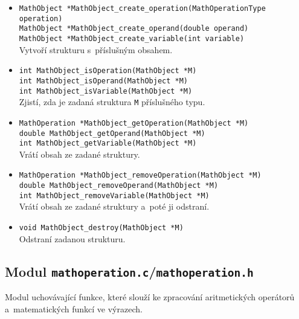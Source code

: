 \documentclass[pdftex,a4paper]{article}
\begin{document}
\begin{itemize}
\item \texttt{MathObject *MathObject\_create\_operation(MathOperationType operation)} \\ 
	  \texttt{MathObject *MathObject\_create\_operand(double operand)} \\
	  \texttt{MathObject *MathObject\_create\_variable(int variable)} \\
	  Vytvoří strukturu s~příslušným obsahem.
	  
\item \texttt{int MathObject\_isOperation(MathObject *M)} \\ 
	  \texttt{int MathObject\_isOperand(MathObject *M)} \\
	  \texttt{int MathObject\_isVariable(MathObject *M)} \\
	  Zjistí, zda je zadaná struktura \texttt{M} příslušného typu.
	  	  
\item \texttt{MathOperation *MathObject\_getOperation(MathObject *M)} \\ 
	  \texttt{double MathObject\_getOperand(MathObject *M)} \\
	  \texttt{int MathObject\_getVariable(MathObject *M)} \\
	  Vrátí obsah ze zadané struktury.
	  	  	  
\item \texttt{MathOperation *MathObject\_removeOperation(MathObject *M)} \\ 
	  \texttt{double MathObject\_removeOperand(MathObject *M)} \\
	  \texttt{int MathObject\_removeVariable(MathObject *M)} \\
	  Vrátí obsah ze zadané struktury a~poté ji odstraní.
	  
\item \texttt{void MathObject\_destroy(MathObject *M)} \\ Odstraní zadanou strukturu.

\end{itemize}



\newpage
\subsection{Modul \texttt{mathoperation.c}/\texttt{mathoperation.h}}
Modul uchovávající funkce, které slouží ke zpracování aritmetických operátorů a~matematických funkcí ve výrazech.
\end{document}
